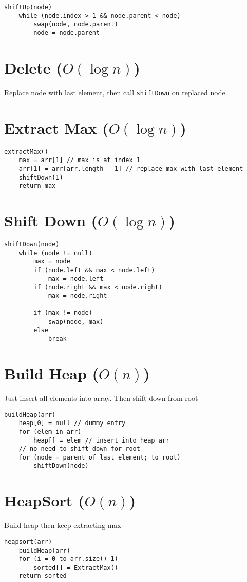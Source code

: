 \documentclass[12pt]{article}
\begin{document}
\begin{spacing}{1.5}
\begin{verbatim}
shiftUp(node) 
    while (node.index > 1 && node.parent < node)
        swap(node, node.parent)
        node = node.parent
\end{verbatim}

\section{Delete ($O(\log{n})$)}

Replace node with last element, then call \texttt{shiftDown} on replaced node. 

\section{Extract Max ($O(\log{n})$)}

\begin{verbatim}
extractMax() 
    max = arr[1] // max is at index 1
    arr[1] = arr[arr.length - 1] // replace max with last element
    shiftDown(1)
    return max
\end{verbatim}

\section{Shift Down ($O(\log{n})$)}

\begin{verbatim}
shiftDown(node) 
    while (node != null)
    	max = node
    	if (node.left && max < node.left)
    	    max = node.left
    	if (node.right && max < node.right)
    	    max = node.right
    	
    	if (max != node)
    	    swap(node, max)
    	else 
    	    break 
\end{verbatim}

\section{Build Heap ($O(n)$)}

Just insert all elements into array. Then shift down from root 

\begin{verbatim}
buildHeap(arr)
    heap[0] = null // dummy entry
    for (elem in arr) 
        heap[] = elem // insert into heap arr
    // no need to shift down for root
    for (node = parent of last element; to root)
        shiftDown(node)
\end{verbatim}

\end{spacing}

\section{HeapSort ($O(n)$)}

Build heap then keep extracting max

\begin{verbatim}
heapsort(arr)
    buildHeap(arr)
    for (i = 0 to arr.size()-1)
    	sorted[] = ExtractMax()
	return sorted
\end{verbatim}
\end{document}
